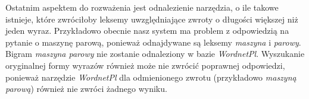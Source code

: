 Ostatnim aspektem do rozważenia jest odnalezienie narzędzia, o ile takowe istnieje, które zwróciłoby leksemy uwzględniające zwroty o długości większej niż jeden wyraz. Przykładowo obecnie nasz system ma problem z odpowiedzią na pytanie o maszynę parową, ponieważ odnajdywane są leksemy \emph{maszyna} i \emph{parowy}. Bigram \emph{maszyna parowy} nie zostanie odnaleziony w bazie \emph{WordnetPl}. Wyszukanie oryginalnej formy wyrazów również może nie zwrócić poprawnej odpowiedzi, ponieważ narzędzie \emph{WordnetPl} dla odmienionego zwrotu (przykładowo \emph{maszyną parową}) również nie zwróci żadnego wyniku.



